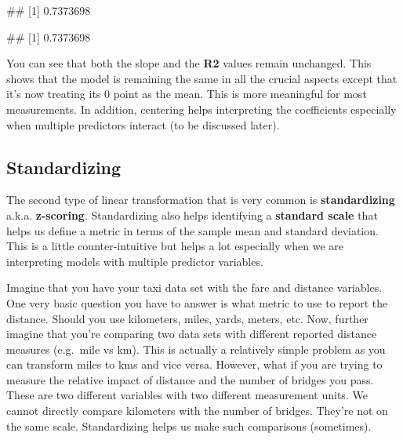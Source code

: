 \documentclass[
]{book}
\newenvironment{Shaded}{\begin{snugshade}}{\end{snugshade}}
\newcommand{\NormalTok}[1]{#1}
\begin{document}
\begin{Shaded}
\end{Shaded}

\begin{Shaded}
\begin{Highlighting}[]
\NormalTok{\#\# [1] 0.7373698}
\end{Highlighting}
\end{Shaded}

\begin{Shaded}
\begin{Highlighting}[]
\NormalTok{\#\# [1] 0.7373698}
\end{Highlighting}
\end{Shaded}

You can see that both the slope and the \textbf{R2} values remain unchanged. This shows that the model is remaining the same in all the crucial aspects except that it's now treating its 0 point as the mean. This is more meaningful for most measurements. In addition, centering helps interpreting the coefficients especially when multiple predictors interact (to be discussed later).

\subsection{Standardizing}\label{standardizing}

The second type of linear transformation that is very common is \textbf{standardizing} a.k.a. \textbf{z-scoring}. Standardizing also helps identifying a \textbf{standard scale} that helps us define a metric in terms of the sample mean and standard deviation. This is a little counter-intuitive but helps a lot especially when we are interpreting models with multiple predictor variables.

Imagine that you have your taxi data set with the fare and distance variables. One very basic question you have to answer is what metric to use to report the distance. Should you use kilometers, miles, yards, meters, etc. Now, further imagine that you're comparing two data sets with different reported distance measures (e.g.~mile vs km). This is actually a relatively simple problem as you can transform miles to kms and vice versa. However, what if you are trying to measure the relative impact of distance and the number of bridges you pass. These are two different variables with two different measurement units. We cannot directly compare kilometers with the number of bridges. They're not on the same scale. Standardizing helps us make such comparisons (sometimes).
\end{document}

